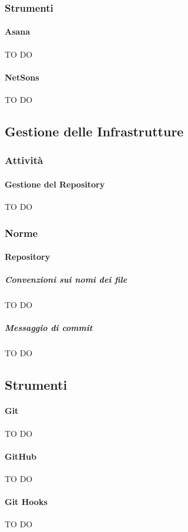 		\subsubsection{Strumenti}
			\paragraph{Asana} \label{sec:Asana}
TO DO
			\paragraph{NetSons}
TO DO
			
			\paragraph{}
	\subsection{Gestione delle Infrastrutture}
		\subsubsection{Attività}
			\paragraph{Gestione del Repository}
TO DO			
		\subsubsection{Norme}
			\paragraph{Repository}
				\subparagraph{Convenzioni sui nomi dei file}
TO DO				
				\subparagraph{Messaggio di commit}
TO DO		
			
		\subsection{Strumenti}
			\paragraph{Git}
TO DO			
			\paragraph{GitHub}
TO DO			
			\paragraph{Git Hooks}
TO DO
